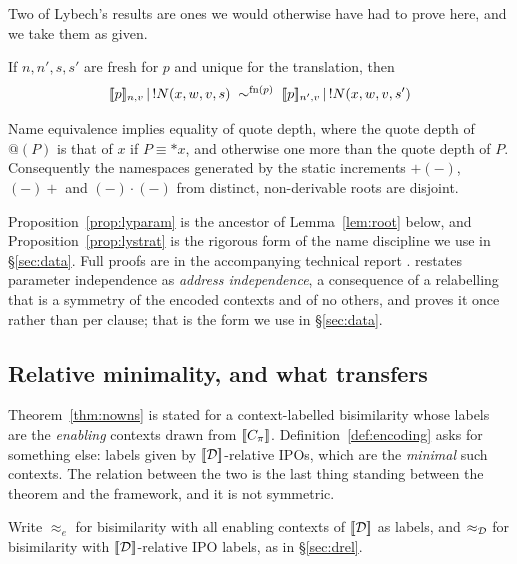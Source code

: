 \documentclass{article}
\begin{document}
Two of Lybech's results are ones we would otherwise have had to prove here, and we take them as given.

\begin{proposition}
\label{prop:lyparam}
    If $n,n',s,s'$ are fresh for $p$ and unique for the translation, then
    \[[\![p]\!]_{n,v}\,|\, !N(x,w,v,s)\;\sim^{\mathrm{fn}(p)}\;[\![p]\!]_{n',v}\,|\, !N(x,w,v,s')\]
\end{proposition}

\begin{proposition}
\label{prop:lystrat}
    Name equivalence implies equality of quote depth, where the quote depth of $@(P)$ is that of $x$ if $P\equiv\ast x$, and otherwise one more than the quote depth of $P$. Consequently the namespaces generated by the static increments $+(-)$, $(-)+$ and $(-)\cdot(-)$ from distinct, non-derivable roots are disjoint.
\end{proposition}

Proposition~\ref{prop:lyparam} is the ancestor of Lemma~\ref{lem:root} below, and Proposition~\ref{prop:lystrat} is the rigorous form of the name discipline we use in \S\ref{sec:data}. Full proofs are in the accompanying technical report \citep{lybech-tr}.  restates parameter independence as \emph{address independence}, a consequence of a relabelling that is a symmetry of the encoded contexts and of no others, and proves it once rather than per clause; that is the form we use in \S\ref{sec:data}.

\subsection{Relative minimality, and what transfers}
\label{sec:collapse}

Theorem~\ref{thm:nowns} is stated for a context-labelled bisimilarity whose labels are the \emph{enabling} contexts drawn from $[\![C_\pi]\!]$. Definition~\ref{def:encoding} asks for something else: labels given by $[\![\mathcal{D}]\!]$-relative IPOs, which are the \emph{minimal} such contexts. The relation between the two is the last thing standing between the theorem and the framework, and it is not symmetric.

Write $\approx_{e}$ for bisimilarity with all enabling contexts of $[\![\mathcal{D}]\!]$ as labels, and $\approx_{\mathcal{D}}$ for bisimilarity with $[\![\mathcal{D}]\!]$-relative IPO labels, as in \S\ref{sec:drel}.
\end{document}
